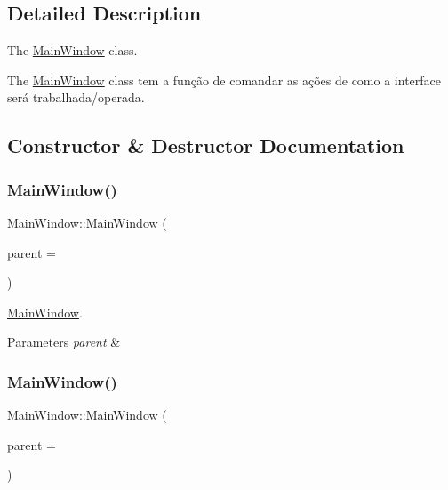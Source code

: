 \subsection{Detailed Description}
The \mbox{\hyperlink{class_main_window}{Main\+Window}} class. 

The \mbox{\hyperlink{class_main_window}{Main\+Window}} class tem a função de comandar as ações de como a interface será trabalhada/operada. 

\subsection{Constructor \& Destructor Documentation}
\mbox{\label{class_main_window_a8b244be8b7b7db1b08de2a2acb9409db}} 
\subsubsection{\texorpdfstring{Main\+Window()}{MainWindow()}\hspace{0.1cm}{\footnotesize\ttfamily [1/2]}}
{\footnotesize\ttfamily Main\+Window\+::\+Main\+Window (\begin{DoxyParamCaption}\item[{Q\+Widget $\ast$}]{parent = {} }\end{DoxyParamCaption})\hspace{0.3cm}{\ttfamily [explicit]}}



\mbox{\hyperlink{class_main_window}{Main\+Window}}. 


\begin{DoxyParams}{Parameters}
{\em parent} & \\
\hline
\end{DoxyParams}
\mbox{\label{class_main_window_a8b244be8b7b7db1b08de2a2acb9409db}} 
\subsubsection{\texorpdfstring{Main\+Window()}{MainWindow()}\hspace{0.1cm}{\footnotesize\ttfamily [2/2]}}
{\footnotesize\ttfamily Main\+Window\+::\+Main\+Window (\begin{DoxyParamCaption}\item[{Q\+Widget $\ast$}]{parent = {} }\end{DoxyParamCaption})\hspace{0.3cm}{\ttfamily [explicit]}}



